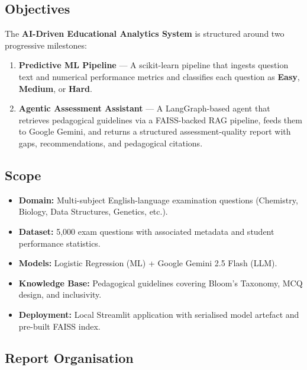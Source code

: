 \documentclass[12pt, a4paper, twoside]{article}
\begin{document}
\subsection{Objectives}

The \textbf{AI-Driven Educational Analytics System} is structured
around two progressive milestones:

\begin{enumerate}[leftmargin=2em, label=\textbf{M\arabic*.}]
    \item \textbf{Predictive ML Pipeline} ---
          A scikit-learn pipeline that ingests question text and
          numerical performance metrics and classifies each question
          as \textcolor{easygreen}{\textbf{Easy}},
          \textcolor{medamber}{\textbf{Medium}}, or
          \textcolor{hardred}{\textbf{Hard}}.

    \item \textbf{Agentic Assessment Assistant} ---
          A LangGraph-based agent that retrieves pedagogical
          guidelines via a FAISS-backed RAG pipeline, feeds them to
          Google Gemini, and returns a structured assessment-quality
          report with gaps, recommendations, and pedagogical citations.
\end{enumerate}

\subsection{Scope}

\begin{itemize}[leftmargin=2em]
    \item \textbf{Domain:} Multi-subject English-language examination
          questions (Chemistry, Biology, Data Structures, Genetics, etc.).
    \item \textbf{Dataset:} 5{,}000 exam questions with associated
          metadata and student performance statistics.
    \item \textbf{Models:} Logistic Regression (ML) + Google Gemini 2.5
          Flash (LLM).
    \item \textbf{Knowledge Base:} Pedagogical guidelines covering
          Bloom's Taxonomy, MCQ design, and inclusivity.
    \item \textbf{Deployment:} Local Streamlit application with
          serialised model artefact and pre-built FAISS index.
\end{itemize}

\subsection{Report Organisation}
\end{document}
